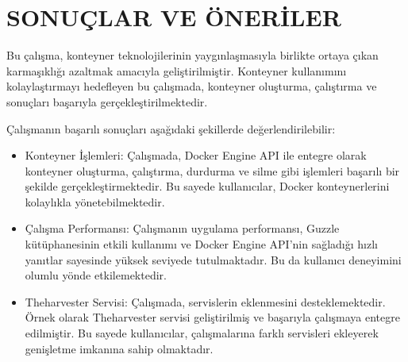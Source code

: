 \section{SONUÇLAR VE ÖNERİLER}

Bu çalışma, konteyner teknolojilerinin yaygınlaşmasıyla birlikte ortaya çıkan karmaşıklığı azaltmak amacıyla geliştirilmiştir. Konteyner kullanımını kolaylaştırmayı hedefleyen bu çalışmada, konteyner oluşturma, çalıştırma ve sonuçları başarıyla gerçekleştirilmektedir. 

Çalışmanın başarılı sonuçları aşağıdaki şekillerde değerlendirilebilir:
\begin{itemize}
    \item Konteyner İşlemleri: Çalışmada, Docker Engine API ile entegre olarak konteyner oluşturma, çalıştırma, durdurma ve silme gibi işlemleri başarılı bir şekilde gerçekleştirmektedir. Bu sayede kullanıcılar, Docker konteynerlerini kolaylıkla yönetebilmektedir.
    \item Çalışma Performansı: Çalışmanın uygulama performansı, Guzzle kütüphanesinin etkili kullanımı ve Docker Engine API'nin sağladığı hızlı yanıtlar sayesinde yüksek seviyede tutulmaktadır. Bu da kullanıcı deneyimini olumlu yönde etkilemektedir.
    \item Theharvester Servisi: Çalışmada, servislerin eklenmesini desteklemektedir. Örnek olarak Theharvester servisi geliştirilmiş ve başarıyla çalışmaya entegre edilmiştir. Bu sayede kullanıcılar, çalışmalarına farklı servisleri ekleyerek genişletme imkanına sahip olmaktadır.
\end{itemize}




